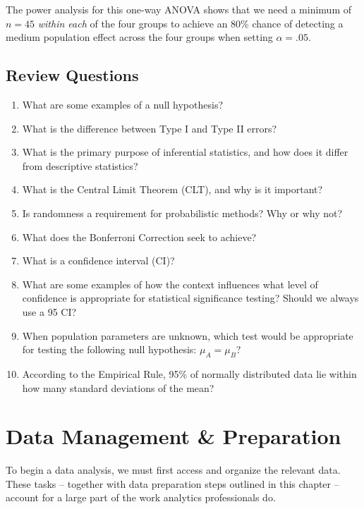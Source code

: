 \documentclass[
]{book}
\begin{document}
The power analysis for this one-way ANOVA shows that we need a minimum of \(n = 45\) \emph{within each} of the four groups to achieve an 80\% chance of detecting a medium population effect across the four groups when setting \(\alpha = .05\).

\hypertarget{review-questions-5}{%
\section{Review Questions}\label{review-questions-5}}

\begin{enumerate}
\def\labelenumi{\arabic{enumi}.}
\item
  What are some examples of a null hypothesis?
\item
  What is the difference between Type I and Type II errors?
\item
  What is the primary purpose of inferential statistics, and how does it differ from descriptive statistics?
\item
  What is the Central Limit Theorem (CLT), and why is it important?
\item
  Is randomness a requirement for probabilistic methods? Why or why not?
\item
  What does the Bonferroni Correction seek to achieve?
\item
  What is a confidence interval (CI)?
\item
  What are some examples of how the context influences what level of confidence is appropriate for statistical significance testing? Should we always use a 95 CI?
\item
  When population parameters are unknown, which test would be appropriate for testing the following null hypothesis: \(\mu_A = \mu_B\)?
\item
  According to the Empirical Rule, 95\% of normally distributed data lie within how many standard deviations of the mean?
\end{enumerate}

\hypertarget{data-mgmt-prep}{%
\chapter{Data Management \& Preparation}\label{data-mgmt-prep}}

To begin a data analysis, we must first access and organize the relevant data. These tasks -- together with data preparation steps outlined in this chapter -- account for a large part of the work analytics professionals do.
\end{document}
